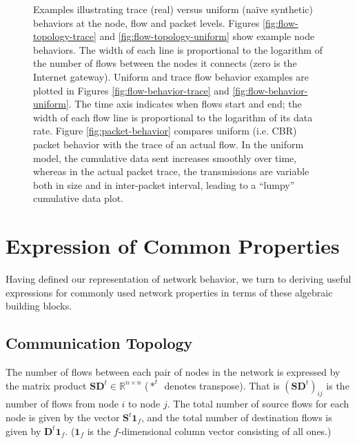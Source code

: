 \documentclass[twocolumn,final]{svjour3}
\newcommand{\R}{\mathbb{R}}
\newcommand{\ones}[1]{\mathbf{1}_{#1}}
\newcommand{\mat}[1]{\mathbf{#1}}
\begin{document}
\begin{figure}[tb]
\begin{center}
\caption{Examples illustrating trace (real) versus uniform (na\"ive synthetic) behaviors at the node, flow and packet levels. Figures \ref{fig:flow-topology-trace} and \ref{fig:flow-topology-uniform} show example node behaviors. The width of each line is proportional to the logarithm of the number of flows between the nodes it connects (zero is the Internet gateway). Uniform and trace flow behavior examples are plotted in Figures \ref{fig:flow-behavior-trace} and \ref{fig:flow-behavior-uniform}. The time axis indicates when flows start and end; the width of each flow line is proportional to the logarithm of its data rate. Figure \ref{fig:packet-behavior} compares uniform (i.e. {\footnotesize{CBR}}) packet behavior with the trace of an actual flow. In the uniform model, the cumulative data sent increases smoothly over time, whereas in the actual packet trace, the transmissions are variable both in size and in inter-packet interval, leading to a ``lumpy'' cumulative data plot.}
\label{fig:trace-vs-uniform}
\end{center}
\vspace{-1.25em}
\end{figure}

\section{Expression of Common Properties}
\label{sec:common-properties}

Having defined our representation of network behavior, we turn to deriving useful expressions for commonly used network properties in terms of these algebraic building blocks.

\subsection{Communication Topology}
\label{sec:communication-topology}

The number of flows between each pair of nodes in the network is expressed by the matrix product $\mat{SD}^t\in\R^{n \times n}$ ($*^t$~denotes transpose). That is $(\mat{SD}^t)_{ij}$ is the number of flows from node $i$ to node $j$. The total number of source flows for each node is given by the vector $\mat{S}^t\ones{f}$, and the total number of destination flows is given by $\mat{D}^t\ones{f}$. ($\ones{f}$ is the $f$-dimensional column vector consisting of all ones.)
\end{document}
